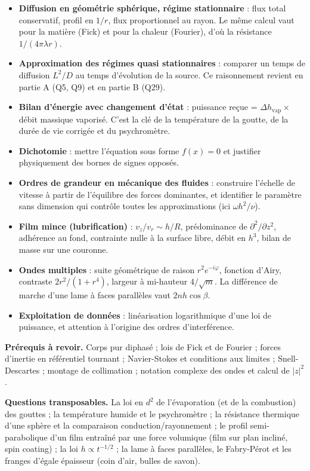\documentclass[11pt,a4paper]{article}
\providecommand{\tightlist}{\setlength{\itemsep}{0pt}\setlength{\parskip}{0pt}}
\begin{document}
\begin{itemize}
\tightlist
\item
  \textbf{Diffusion en géométrie sphérique, régime stationnaire} : flux total conservatif, profil en \(1/r\), flux proportionnel au rayon. Le même calcul vaut pour la matière (Fick) et pour la chaleur (Fourier), d'où la résistance \(1/(4\pi\lambda r)\).
\item
  \textbf{Approximation des régimes quasi stationnaires} : comparer un temps de diffusion \(L^2/D\) au temps d'évolution de la source. Ce raisonnement revient en partie A (Q5, Q9) et en partie B (Q29).
\item
  \textbf{Bilan d'énergie avec changement d'état} : puissance reçue = \(\Delta h_{\text{vap}}\times\) débit massique vaporisé. C'est la clé de la température de la goutte, de la durée de vie corrigée et du psychromètre.
\item
  \textbf{Dichotomie} : mettre l'équation sous forme \(f(x)=0\) et justifier physiquement des bornes de signes opposés.
\item
  \textbf{Ordres de grandeur en mécanique des fluides} : construire l'échelle de vitesse à partir de l'équilibre des forces dominantes, et identifier le paramètre sans dimension qui contrôle toutes les approximations (ici \(\omega h^2/\nu\)).
\item
  \textbf{Film mince (lubrification)} : \(v_z/v_r\sim h/R\), prédominance de \(\partial^2/\partial z^2\), adhérence au fond, contrainte nulle à la surface libre, débit en \(h^3\), bilan de masse sur une couronne.
\item
  \textbf{Ondes multiples} : suite géométrique de raison \(r^2e^{-i\varphi}\), fonction d'Airy, contraste \(2r^2/(1+r^4)\), largeur à mi-hauteur \(4/\sqrt m\). La différence de marche d'une lame à faces parallèles vaut \(2nh\cos\beta\).
\item
  \textbf{Exploitation de données} : linéarisation logarithmique d'une loi de puissance, et attention à l'origine des ordres d'interférence.
\end{itemize}

\textbf{Prérequis à revoir.} Corps pur diphasé ; lois de Fick et de Fourier ; forces d'inertie en référentiel tournant ; Navier-Stokes et conditions aux limites ; Snell-Descartes ; montage de collimation ; notation complexe des ondes et calcul de \(|z|^2\).

\textbf{Questions transposables.} La loi en \(d^2\) de l'évaporation (et de la combustion) des gouttes ; la température humide et le psychromètre ; la résistance thermique d'une sphère et la comparaison conduction/rayonnement ; le profil semi-parabolique d'un film entraîné par une force volumique (film sur plan incliné, spin coating) ; la loi \(h\propto t^{-1/2}\) ; la lame à faces parallèles, le Fabry-Pérot et les franges d'égale épaisseur (coin d'air, bulles de savon).
\end{document}
